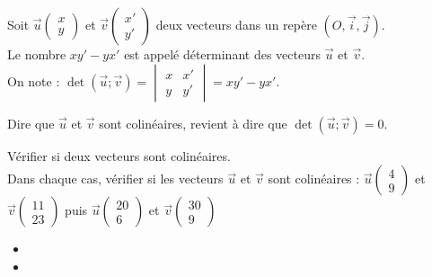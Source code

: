 \begin{Définition}
Soit  $\overrightarrow{u}\begin{pmatrix} 
x \\
y
 \end{pmatrix}$ et $\overrightarrow{v}\begin{pmatrix} 
x' \\
y'
 \end{pmatrix}$ deux vecteurs dans un repère $(O,\overrightarrow{i},\overrightarrow{j})$.\\
 Le nombre $xy'-yx'$ est appelé déterminant des vecteurs $\overrightarrow{u}$ et $\overrightarrow{v}$.\\
 On note : $\det(\overrightarrow{u};\overrightarrow{v})=\begin{vmatrix}
 x & x' \\
 y & y'
 \end{vmatrix}=xy'-yx'$.

\end{Définition}

\begin{Propriété}
Dire que $\overrightarrow{u}$ et $\overrightarrow{v}$ sont colinéaires, revient à dire que $\det(\overrightarrow{u};\overrightarrow{v})=0$.

\end{Propriété}

\begin{Méthode}Vérifier si deux vecteurs sont colinéaires. \\
Dans chaque cas, vérifier si les vecteurs $\overrightarrow{u}$ et $\overrightarrow{v}$ sont colinéaires : $\overrightarrow{u}\begin{pmatrix} 
4 \\
9
 \end{pmatrix}$ et $\overrightarrow{v}\begin{pmatrix} 
11 \\
23
 \end{pmatrix}$ puis $\overrightarrow{u}\begin{pmatrix} 
20 \\
6
 \end{pmatrix}$ et $\overrightarrow{v}\begin{pmatrix} 
30 \\
9
 \end{pmatrix}$\\
\begin{itemize}[label=\textcolor{Couleur3}{$\bullet$}]
 \item \ligne

\ligne

\ligne

\item \ligne

\ligne

\ligne

\ligne

\ligne


\end{itemize}
 



\end{Méthode}

